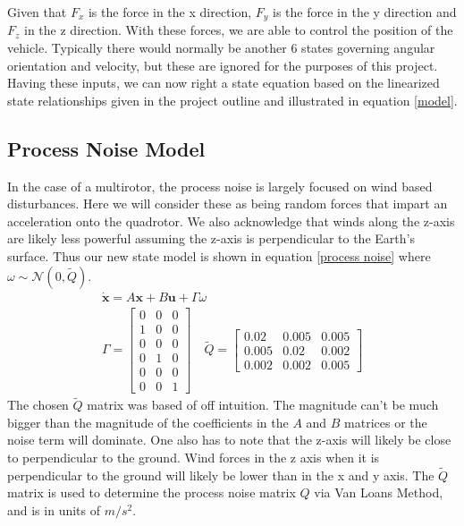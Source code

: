 \documentclass[12pt]{extarticle}
\begin{document}
{Given that $F_x$ is the force in the x direction, $F_y$ is the force in the y direction and $F_z$ in the z direction. With these forces, we are able to control the position of the vehicle. Typically there would normally be another 6 states governing angular orientation and velocity, but these are ignored for the purposes of this project. Having these inputs, we can now right a state equation based on the linearized state relationships given in the project outline and illustrated in equation \ref{model}.


\newpage{}

}
\subsection{Process Noise Model}{
    In the case of a multirotor, the process noise is largely focused on wind based disturbances. Here we will consider these as being random forces that impart an acceleration onto the quadrotor. We also acknowledge that winds along the z-axis are likely less powerful assuming the z-axis is perpendicular to the Earth's surface. Thus our new state model is shown in equation \ref{process noise} where $\omega\sim\mathcal{N}(0,\tilde{Q})$.
    \begin{equation}\label{process noise}\begin{split}
        \dot{\pmb{x}}=A\pmb{x}+B\pmb{u}+\Gamma\omega\\
        \Gamma=\begin{bmatrix}
            0&0&0\\
            1&0&0\\
            0&0&0\\
            0&1&0\\
            0&0&0\\
            0&0&1
            \end{bmatrix}\quad
        \tilde{Q}=\begin{bmatrix}
        0.02&0.005&0.005\\
        0.005&0.02&0.002\\
        0.002&0.002&0.005\end{bmatrix}
        \end{split}\end{equation}
    The chosen $\tilde{Q}$ matrix was based of off intuition. The magnitude can't be much bigger than the magnitude of the coefficients in the $A$ and $B$ matrices or the noise term will dominate. One also has to note that the z-axis will likely be close to perpendicular to the ground. Wind forces in the z axis when it is perpendicular to the ground will likely be lower than in the x and y axis. The $\tilde{Q}$ matrix is used to determine the process noise matrix $Q$ via Van Loans Method, and is in units of $m/s^2$.
}
\end{document}
